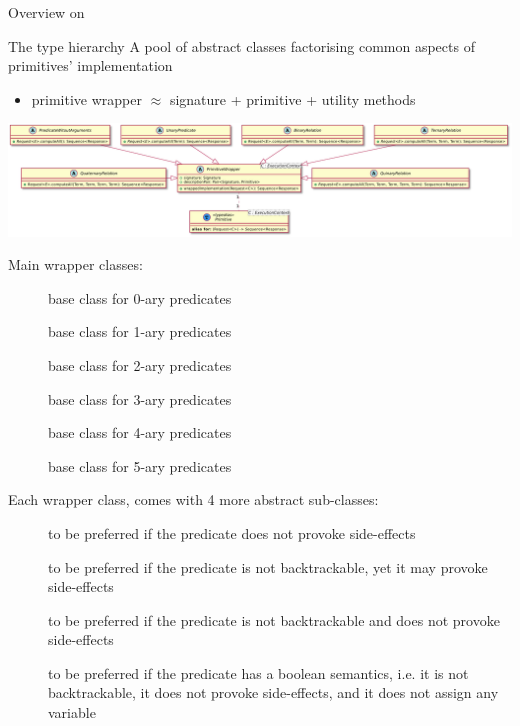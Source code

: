 \documentclass[handout]{beamer}
\begin{document}
\begin{frame}[allowframebreaks]{Overview on }
    \begin{block}{The  type hierarchy}
        A pool of abstract classes factorising common aspects of primitives' implementation
        \begin{itemize}
            \item primitive wrapper $\approx$ signature + primitive + utility methods
        \end{itemize}
    \end{block}

    \framebreak

    \begin{center}
        \includegraphics[width=\linewidth]{img/wrappers.pdf}
    \end{center}

    \framebreak

    Main wrapper classes:
    \begin{description}
        \item[] base class for 0-ary predicates
        \item[] base class for 1-ary predicates
        \item[] base class for 2-ary predicates
        \item[] base class for 3-ary predicates
        \item[] base class for 4-ary predicates
        \item[] base class for 5-ary predicates
    \end{description}

    \framebreak

    Each wrapper class, comes with 4 more abstract sub-classes:
    \begin{description}
        \item[] to be preferred if the predicate does not provoke side-effects
        \item[] to be preferred if the predicate is not backtrackable, yet it may provoke side-effects
        \item[] to be preferred if the predicate is not backtrackable and does not provoke side-effects
        \item[] to be preferred if the predicate has a boolean semantics, i.e. it is not backtrackable, it does not provoke side-effects, and it does not assign any variable
    \end{description}
\end{frame}
\end{document}
